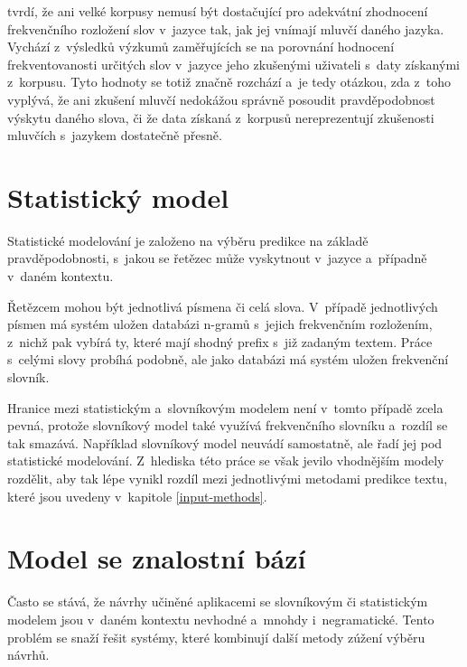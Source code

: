 \documentclass[a4paper,11pt,openany]{book} %
\begin{document}
\textcite{alderson2007judging} tvrdí, že ani velké korpusy nemusí být dostačující pro adekvátní zhodnocení frekvenčního rozložení slov v~jazyce tak, jak jej vnímají mluvčí daného jazyka. Vychází z~výsledků výzkumů zaměřujících se na porovnání hodnocení frekventovanosti určitých slov v~jazyce jeho zkušenými uživateli s~daty získanými z~korpusu. Tyto hodnoty se totiž značně rozchází a~je tedy otázkou, zda z~toho vyplývá, že ani zkušení mluvčí nedokážou správně posoudit pravděpodobnost výskytu daného slova, či že data získaná z~korpusů nereprezentují zkušenosti mluvčích s~jazykem dostatečně přesně.

\section{Statistický model}

Statistické modelování je založeno na výběru predikce na základě pravděpodobnosti, s~jakou se řetězec může vyskytnout v~jazyce a~případně v~daném kontextu. \parencite[5233]{ghayoomi2009overview}

Řetězcem mohou být jednotlivá písmena či celá slova. V~případě jednotlivých písmen má systém uložen databázi n-gramů s~jejich frekvenčním rozložením, z~nichž pak vybírá ty, které mají shodný prefix s~již zadaným textem. Práce s~celými slovy probíhá podobně, ale jako databázi má systém uložen frekvenční slovník. 

Hranice mezi statistickým a~slovníkovým modelem není v~tomto případě zcela pevná, protože slovníkový model také využívá frekvenčního slovníku a~rozdíl se tak smazává. Například \textcite[5234]{ghayoomi2009overview} slovníkový model neuvádí samostatně, ale řadí jej pod statistické modelování. Z~hlediska této práce se však jevilo vhodnějším modely rozdělit, aby tak lépe vynikl rozdíl mezi jednotlivými metodami predikce textu, které jsou uvedeny v~kapitole \ref{input-methods}.

\section{Model se znalostní bází}

Často se stává, že návrhy učiněné aplikacemi se slovníkovým či statistickým modelem jsou v~daném kontextu nevhodné a~mnohdy i~negramatické. Tento problém se snaží řešit systémy, které kombinují další metody zúžení výběru návrhů. 
\end{document}
